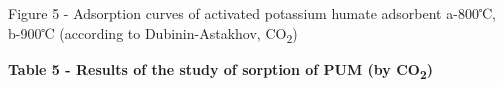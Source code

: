 Figure 5 - Adsorption curves of activated potassium humate adsorbent
a-800℃, b-900℃ (according to Dubinin-Astakhov, CO\textsubscript{2})

{\bfseries Table 5 - Results of the study of sorption of PUM (by
CO\textsubscript{2})}

